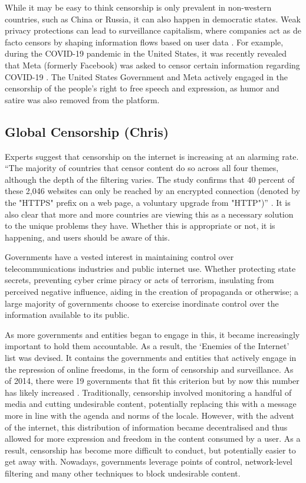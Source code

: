 While it may be easy to think censorship is only prevalent in non-western countries, such as China or Russia, it can also happen in democratic states. Weak privacy protections can lead to surveillance capitalism, where companies act as de facto censors by shaping information flows based on user data \cite{schwartz1999internet}. For example, during the COVID-19 pandemic in the United States, it was recently revealed that Meta (formerly Facebook) was asked to censor certain information regarding COVID-19 \cite{pbsZuckerbergSays}. The United States Government and Meta actively engaged in the censorship of the people's right to free speech and expression, as humor and satire was also removed from the platform.

\subsection{Global Censorship (Chris)}

Experts suggest that censorship on the internet is increasing at an alarming rate. “The majority of countries that censor content do so across all four themes, although the depth of the filtering varies. The study confirms that 40 percent of these 2,046 websites can only be reached by an 
encrypted connection (denoted by the "HTTPS" prefix on a web page, a voluntary upgrade from "HTTP")” \cite{zittrain2017shifting}. It is also clear that more and more countries are viewing this as a necessary solution to the unique problems they have. Whether this is appropriate or not, it is happening, and users should be aware of this. 

Governments have a vested interest in maintaining control over telecommunications industries and public internet use. Whether protecting state secrets, preventing cyber crime piracy or acts of terrorism, insulating from perceived negative influence, aiding in the creation of propaganda or otherwise; a large majority of governments choose to exercise inordinate control over the 
information available to its public.  

As more governments and entities began to engage in this, it became increasingly important to hold them accountable. As a result, the ‘Enemies of the Internet’ list was devised. It contains the governments and entities that actively engage in the repression of online freedoms, in the form of censorship and surveillance. As of 2014, there were 19 governments that fit this criterion but by now this number has likely increased \cite{GlobalCensorshipRef2}. Traditionally, censorship involved monitoring a handful of media and cutting undesirable content, potentially replacing this with a message more in line with the agenda and norms of the locale. However, with the advent of the internet, this distribution of information became decentralised and thus allowed for more expression and freedom in the content consumed by a user. As a result, censorship has become more difficult to conduct, but potentially easier to get away with. Nowadays, governments leverage points of control, network-level filtering and many other techniques to block undesirable content.




